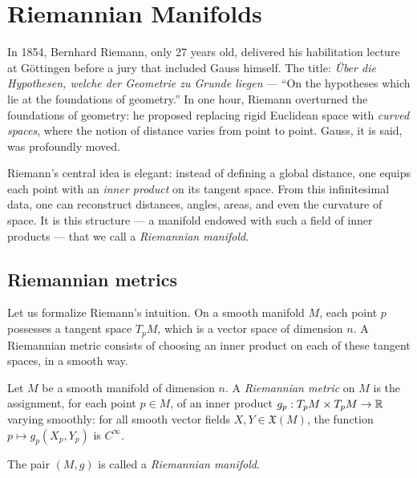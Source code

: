 \chapter{Riemannian Manifolds}
\label{ch:manifolds}

In 1854, Bernhard Riemann, only 27 years old, delivered his habilitation
lecture at G\"ottingen before a jury that included Gauss himself. The title:
\emph{\"Uber die Hypothesen, welche der Geometrie zu Grunde liegen} ---
``On the hypotheses which lie at the foundations of geometry.'' In one hour,
Riemann overturned the foundations of geometry: he proposed replacing rigid
Euclidean space with \emph{curved spaces}, where the notion of distance
varies from point to point. Gauss, it is said, was profoundly moved.

Riemann's central idea is elegant: instead of defining a global distance,
one equips each point with an \emph{inner product} on its tangent space.
From this infinitesimal data, one can reconstruct distances, angles, areas,
and even the curvature of space. It is this structure --- a manifold endowed
with such a field of inner products --- that we call a \emph{Riemannian
manifold}.

\section{Riemannian metrics}

Let us formalize Riemann's intuition. On a smooth manifold $M$, each point
$p$ possesses a tangent space $T_pM$, which is a vector space of dimension
$n$. A Riemannian metric consists of choosing an inner product on each of
these tangent spaces, in a smooth way.

\begin{definition}
Let $M$ be a smooth manifold of dimension $n$. A \emph{Riemannian metric} on $M$
is the assignment, for each point $p \in M$, of an inner product
$g_p : T_pM \times T_pM \to \mathbb{R}$ varying smoothly: for all smooth vector fields
$X, Y \in \mathfrak{X}(M)$, the function $p \mapsto g_p(X_p, Y_p)$ is $C^\infty$.

The pair $(M, g)$ is called a \emph{Riemannian manifold}.
\end{definition}

